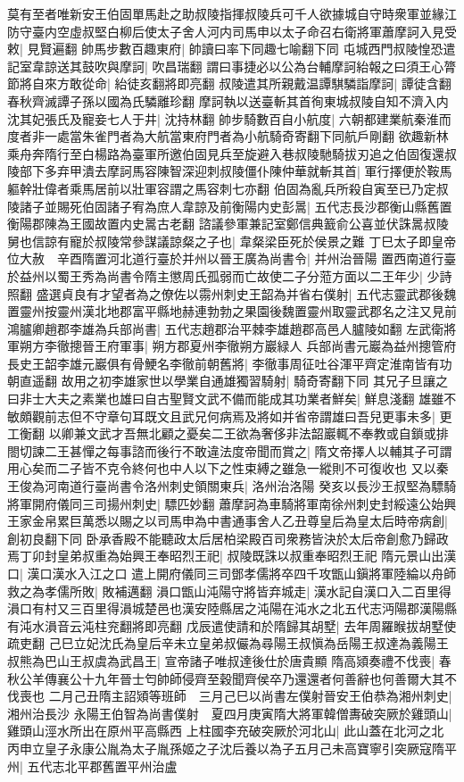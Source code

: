 莫有至者唯新安王伯固單馬赴之助叔陵指揮叔陵兵可千人欲據城自守時衆軍並緣江防守臺内空虛叔堅白柳后使太子舍人河内司馬申以太子命召右衛將軍蕭摩訶入見受敕|{
	見賢遍翻}
帥馬步數百趣東府|{
	帥讀曰率下同趣七喻翻下同}
屯城西門叔陵惶恐遣記室韋諒送其鼓吹與摩訶|{
	吹昌瑞翻}
謂曰事捷必以公為台輔摩訶紿報之曰須王心膂節將自來方敢從命|{
	紿徒亥翻將即亮翻}
叔陵遣其所親戴温譚騏驎詣摩訶|{
	譚徒含翻春秋齊滅譚子孫以國為氏驎離珍翻}
摩訶執以送臺斬其首徇東城叔陵自知不濟入内沈其妃張氏及寵妾七人于井|{
	沈持林翻}
帥步騎數百自小航度|{
	六朝都建業航秦淮而度者非一處當朱雀門者為大航當東府門者為小航騎奇寄翻下同航戶剛翻}
欲趣新林乘舟奔隋行至白楊路為臺軍所邀伯固見兵至旋避入巷叔陵馳騎拔刃追之伯固復還叔陵部下多弃甲潰去摩訶馬容陳智深迎刺叔陵僵仆陳仲華就斬其首|{
	軍行擇便於鞍馬軀幹壯偉者乘馬居前以壯軍容謂之馬容刺七亦翻}
伯固為亂兵所殺自寅至已乃定叔陵諸子並賜死伯固諸子宥為庶人韋諒及前衡陽内史彭暠|{
	五代志長沙郡衡山縣舊置衡陽郡陳為王國故置内史暠古老翻}
諮議參軍兼記室鄭信典籖俞公喜並伏誅暠叔陵舅也信諒有寵於叔陵常參謀議諒粲之子也|{
	韋粲梁臣死於侯景之難}
丁巳太子即皇帝位大赦　辛酉隋置河北道行臺於并州以晉王廣為尚書令|{
	并州治晉陽}
置西南道行臺於益州以蜀王秀為尚書令隋主懲周氏孤弱而亡故使二子分蒞方面以二王年少|{
	少詩照翻}
盛選貞良有才望者為之僚佐以霛州刺史王韶為并省右僕射|{
	五代志靈武郡後魏置靈州按靈州漢北地郡富平縣地赫連勃勃之果園後魏置靈州取靈武郡名之注又見前}
鴻臚卿趙郡李雄為兵部尚書|{
	五代志趙郡治平棘李雄趙郡高邑人臚陵如翻}
左武衛將軍朔方李徹摠晉王府軍事|{
	朔方郡夏州李徹朔方巖緑人}
兵部尚書元巖為益州摠管府長史王韶李雄元巖俱有骨鯁名李徹前朝舊將|{
	李徹事周征吐谷渾平齊定淮南皆有功朝直遥翻}
故用之初李雄家世以學業自通雄獨習騎射|{
	騎奇寄翻下同}
其兄子旦讓之曰非士大夫之素業也雄曰自古聖賢文武不備而能成其功業者鮮矣|{
	鮮息淺翻}
雄雖不敏頗觀前志但不守章句耳既文且武兄何病焉及將如并省帝謂雄曰吾兒更事未多|{
	更工衡翻}
以卿兼文武才吾無北顧之憂矣二王欲為奢侈非法韶巖輒不奉教或自鎖或排閤切諫二王甚憚之每事諮而後行不敢違法度帝聞而賞之|{
	隋文帝擇人以輔其子可謂用心矣而二子皆不克令終何也中人以下之性束縛之雖急一縱則不可復收也}
又以秦王俊為河南道行臺尚書令洛州刺史領關東兵|{
	洛州治洛陽}
癸亥以長沙王叔堅為驃騎將軍開府儀同三司揚州刺史|{
	驃匹妙翻}
蕭摩訶為車騎將軍南徐州刺史封綏遠公始興王家金帛累巨萬悉以賜之以司馬申為中書通事舍人乙丑尊皇后為皇太后時帝病創|{
	創初良翻下同}
卧承香殿不能聽政太后居柏梁殿百司衆務皆決於太后帝創愈乃歸政焉丁卯封皇弟叔重為始興王奉昭烈王祀|{
	叔陵既誅以叔重奉昭烈王祀}
隋元景山出漢口|{
	漢口漢水入江之口}
遣上開府儀同三司鄧孝儒將卒四千攻甑山鎭將軍陸綸以舟師救之為孝儒所敗|{
	敗補邁翻}
溳口甑山沌陽守將皆弃城走|{
	漢水記自漢口入二百里得溳口有村又三百里得溳城楚邑也漢安陸縣居之沌陽在沌水之北五代志沔陽郡漢陽縣有沌水溳音云沌柱兖翻將即亮翻}
戊辰遣使請和於隋歸其胡墅|{
	去年周羅睺拔胡墅使疏吏翻}
己巳立妃沈氏為皇后辛未立皇弟叔儼為尋陽王叔愼為岳陽王叔達為義陽王叔熊為巴山王叔虞為武昌王|{
	宣帝諸子唯叔達後仕於唐貴顯}
隋高熲奏禮不伐喪|{
	春秋公羊傳襄公十九年晉士匄帥師侵齊至穀聞齊侯卒乃還還者何善辭也何善爾大其不伐喪也}
二月己丑隋主詔熲等班師　三月己巳以尚書左僕射晉安王伯恭為湘州刺史|{
	湘州治長沙}
永陽王伯智為尚書僕射　夏四月庚寅隋大將軍韓僧夀破突厥於雞頭山|{
	雞頭山涇水所出在原州平高縣西}
上柱國李充破突厥於河北山|{
	此山蓋在北河之北}
丙申立皇子永康公胤為太子胤孫姬之子沈后養以為子五月己未高寶寧引突厥寇隋平州|{
	五代志北平郡舊置平州治盧}


